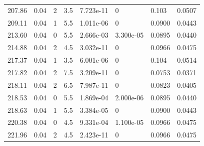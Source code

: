 \documentclass[preview]{standalone}
\begin{document}
{{{{{\begin{tabular}{L{1.2cm}C{1.2cm} C{0.3cm}C{0.5cm} C{1.4cm}C{1.4cm} C{1.4cm}C{1.4cm}}
  207.86  &  0.04  & 2     & 3.5 &  7.723e-11  & 0  & 0.103 &  0.0507   \\ 
  209.11  &  0.04  & 1     & 5.5 &  1.011e-06  & 0  & 0.0900 &  0.0443   \\ 
  213.60  &  0.04  & 0     & 5.5 &  2.666e-03  & 3.300e-05  & 0.0895 &  0.0440   \\ 
  214.88  &  0.04  & 2     & 4.5 &  3.032e-11  & 0  & 0.0966 &  0.0475   \\ 
  217.37  &  0.04  & 1     & 3.5 &  6.001e-06  & 0  & 0.104 &  0.0514   \\ 
  217.82  &  0.04  & 2     & 7.5 &  3.209e-11  & 0  & 0.0753 &  0.0371   \\ 
  218.11  &  0.04  & 2     & 6.5 &  7.987e-11  & 0  & 0.0823 &  0.0405   \\ 
  218.53  &  0.04  & 0     & 5.5 &  1.869e-04  & 2.000e-06  & 0.0895 &  0.0440   \\ 
  218.63  &  0.04  & 1     & 5.5 &  3.384e-05  & 0  & 0.0900 &  0.0443   \\ 
  220.38  &  0.04  & 0     & 4.5 &  9.331e-04  & 1.100e-05  & 0.0966 &  0.0475   \\ 
  221.96  &  0.04  & 2     & 4.5 &  2.423e-11  & 0  & 0.0966 &  0.0475   \\ 
\hline 
\end{tabular} 

}}}}}
\end{document}
